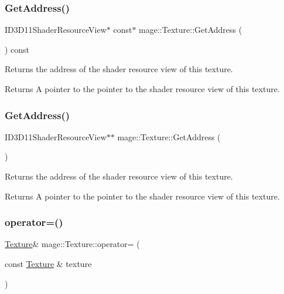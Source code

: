 \subsubsection{\texorpdfstring{Get\+Address()}{GetAddress()}\hspace{0.1cm}{\footnotesize\ttfamily [1/2]}}
{\footnotesize\ttfamily I\+D3\+D11\+Shader\+Resource\+View$\ast$ const$\ast$ mage\+::\+Texture\+::\+Get\+Address (\begin{DoxyParamCaption}{ }\end{DoxyParamCaption}) const\hspace{0.3cm}{\ttfamily [noexcept]}}

Returns the address of the shader resource view of this texture.

\begin{DoxyReturn}{Returns}
A pointer to the pointer to the shader resource view of this texture. 
\end{DoxyReturn}
\hypertarget{classmage_1_1_texture_a4f64ce2ddf3cee7283613e9dbb137e23}{}\label{classmage_1_1_texture_a4f64ce2ddf3cee7283613e9dbb137e23} 
\subsubsection{\texorpdfstring{Get\+Address()}{GetAddress()}\hspace{0.1cm}{\footnotesize\ttfamily [2/2]}}
{\footnotesize\ttfamily I\+D3\+D11\+Shader\+Resource\+View$\ast$$\ast$ mage\+::\+Texture\+::\+Get\+Address (\begin{DoxyParamCaption}{ }\end{DoxyParamCaption})\hspace{0.3cm}{\ttfamily [noexcept]}}

Returns the address of the shader resource view of this texture.

\begin{DoxyReturn}{Returns}
A pointer to the pointer to the shader resource view of this texture. 
\end{DoxyReturn}
\hypertarget{classmage_1_1_texture_a0b73b4df98d729c8f60e58b0ca065636}{}\label{classmage_1_1_texture_a0b73b4df98d729c8f60e58b0ca065636} 
\subsubsection{\texorpdfstring{operator=()}{operator=()}\hspace{0.1cm}{\footnotesize\ttfamily [1/2]}}
{\footnotesize\ttfamily \hyperlink{classmage_1_1_texture}{Texture}\& mage\+::\+Texture\+::operator= (\begin{DoxyParamCaption}\item[{const \hyperlink{classmage_1_1_texture}{Texture} \&}]{texture }\end{DoxyParamCaption})\hspace{0.3cm}{\ttfamily [delete]}}

